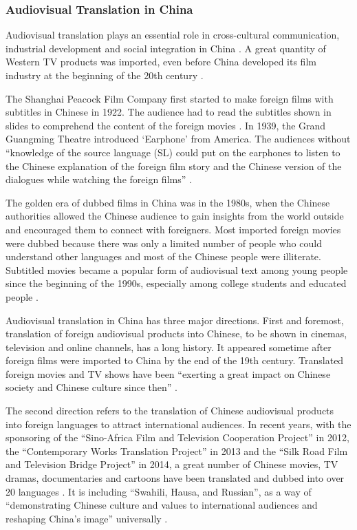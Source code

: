 \documentclass[english]{textolivre}
\begin{document}
\subsubsection{Audiovisual Translation in China }\label{sec-modelo}
Audiovisual translation plays an essential role in cross-cultural communication, industrial development and social integration in China \cite{yves_audiovisual_2018}. A great quantity of Western TV products was imported, even before China developed its film industry at the beginning of the 20th century \cite{haikuo_film_2015}. 

The Shanghai Peacock Film Company first started to make foreign films with subtitles in Chinese in 1922. The audience had to read the subtitles shown in slides to comprehend the content of the foreign movies \cite{haikuo_film_2015}. In 1939, the Grand Guangming Theatre introduced `Earphone' from America. The audiences without “knowledge of the source language (SL) could put on the earphones to listen to the Chinese explanation of the foreign film story and the Chinese version of the dialogues while watching the foreign films” \cite[p. 28]{jin_comparative_2018}. 

The golden era of dubbed films in China was in the 1980s, when the Chinese authorities allowed the Chinese audience to gain insights from the world outside and encouraged them to connect with foreigners. Most imported foreign movies were dubbed because there was only a limited number of people who could understand other languages and most of the Chinese people were illiterate. Subtitled movies became a popular form of audiovisual text among young people since the beginning of the 1990s, especially among college students and educated people \cite{haikuo_film_2015}. 

Audiovisual translation in China has three major directions. First and foremost, translation of foreign audiovisual products into Chinese, to be shown in cinemas, television and online channels, has a long history. It appeared sometime after foreign films were imported to China by the end of the 19th century. Translated foreign movies and TV shows have been “exerting a great impact on Chinese society and Chinese culture since then” \cite[p. 27]{jin_comparative_2018}. 

The second direction refers to the translation of Chinese audiovisual products into foreign languages to attract international audiences. In recent years, with the sponsoring of the “Sino-Africa Film and Television Cooperation Project” in 2012, the “Contemporary Works Translation Project” in 2013 and the “Silk Road Film and Television Bridge Project” in 2014, a great number of Chinese movies, TV dramas, documentaries and cartoons have been translated and dubbed into over 20 languages \cite[p. 27]{jin_comparative_2018}. It is including “Swahili, Hausa, and Russian”, as a way of “demonstrating Chinese culture and values to international audiences and reshaping China's image” universally \cite[p.~27]{jin_comparative_2018}.  
\end{document}
